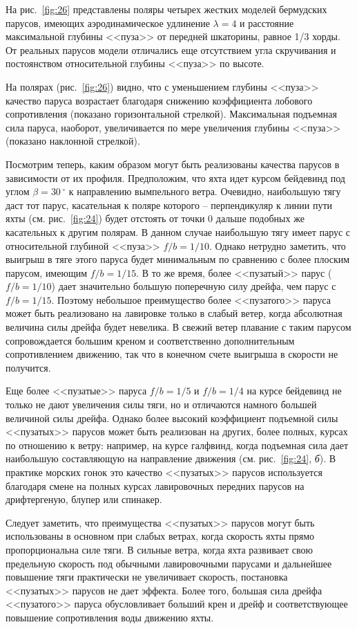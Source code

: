 \documentclass[a4paper, 12pt, twoside, final, book, russian, fittopage, cyremdash]{ncc}
\newcommand{\gr}{\ensuremath{\,^\circ}\xspace}
\newcommand{\ris}[1]{\ref{fig:#1}}
\begin{document}
На рис.~\ris{26} представлены поляры четырех жестких моделей бермудских парусов, имеющих аэродинамическое удлинение $\lambda = 4$ и расстояние максимальной глубины <<пуза>> от передней шкаторины, равное 1/3 хорды. От реальных парусов модели отличались еще отсутствием угла скручивания и постоянством относительной глубины <<пуза>> по высоте.

На полярах (рис.~\ris{26}) видно, что с уменьшением глубины <<пуза>> качество паруса возрастает благодаря снижению коэффициента лобового сопротивления (показано горизонтальной стрелкой). Максимальная подъемная сила паруса, наоборот, увеличивается по мере увеличения глубины <<пуза>> (показано наклонной стрелкой).

Посмотрим теперь, каким образом могут быть реализованы качества парусов в зависимости от их профиля. Предположим, что яхта идет курсом бейдевинд под углом $\beta = 30\gr$ к направлению вымпельного ветра. Очевидно, наибольшую тягу даст тот парус, касательная к поляре которого \--- перпендикуляр к линии пути яхты (см. рис.~\ris{24}) будет отстоять от точки 0 дальше подобных же касательных к другим полярам. В данном случае наибольшую тягу имеет парус с относительной глубиной <<пуза>> $f/b=1/10$. Однако нетрудно заметить, что выигрыш в тяге этого паруса будет минимальным по сравнению с более плоским парусом, имеющим $f/b = 1/15$. В то же время, более <<пузатый>> парус ($f/b = 1/10$) дает значительно большую поперечную силу дрейфа, чем парус с $f/b = 1/15$. Поэтому небольшое преимущество более <<пузатого>> паруса может быть реализовано на лавировке только в слабый ветер, когда абсолютная величина силы дрейфа будет невелика. В свежий ветер плавание с таким парусом сопровождается большим креном и соответственно дополнительным сопротивлением движению, так что в конечном счете выигрыша в скорости не получится. 

Еще более <<пузатые>> паруса $f/b=1/5$ и $f/b=1/4$ на курсе бейдевинд не только не дают увеличения силы тяги, но и отличаются намного большей величиной силы дрейфа. Однако более высокий коэффициент подъемной силы <<пузатых>> парусов может быть реализован на других, более полных, курсах по отношению к ветру: например, на курсе галфвинд, когда подъемная сила дает наибольшую составляющую на направление движения (см. рис.~\ris{24}, \textit{б}). В практике морских гонок это качество <<пузатых>> парусов используется благодаря смене на полных курсах лавировочных передних парусов на дрифтергеную, блупер или спинакер.

Следует заметить, что преимущества <<пузатых>> парусов могут быть использованы в основном при слабых ветрах, когда скорость яхты прямо пропорциональна силе тяги. В сильные ветра, когда яхта развивает свою предельную скорость под обычными лавировочными парусами и дальнейшее повышение тяги практически не увеличивает скорость, постановка <<пузатых>> парусов не дает эффекта. Более того, большая сила дрейфа <<пузатого>> паруса обусловливает больший крен и дрейф и соответствующее повышение сопротивления воды движению яхты. 
\end{document}

